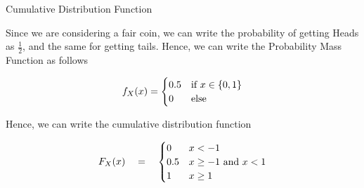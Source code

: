 \documentclass{article}
\begin{document}
\begin{ssection}{Cumulative Distribution Function}
\begin{example}
		Since we are considering a fair coin, we can write the probability of getting Heads as $\frac{1}{2}$, and the same for getting tails. Hence, we can write the Probability Mass Function as follows

		\begin{align*}
			f_X(x) = \begin{cases}
				0.5	&	\text{if}\,\, x \in \left\{ {0, 1} \right\} \\
				0	&	\text{else}\,\,
			\end{cases}
		\end{align*}

		Hence, we can write the cumulative distribution function

		\begin{align*}
			F_X(x)	\quad = \quad	\begin{cases}
				0	&	x < -1						\\
				0.5	&	x \ge -1 \,\,\text{and}\,\, x < 1	\\
				1	&	x \ge 1
			\end{cases}
		\end{align*}
	\end{example}

\end{ssection}
\end{document}
